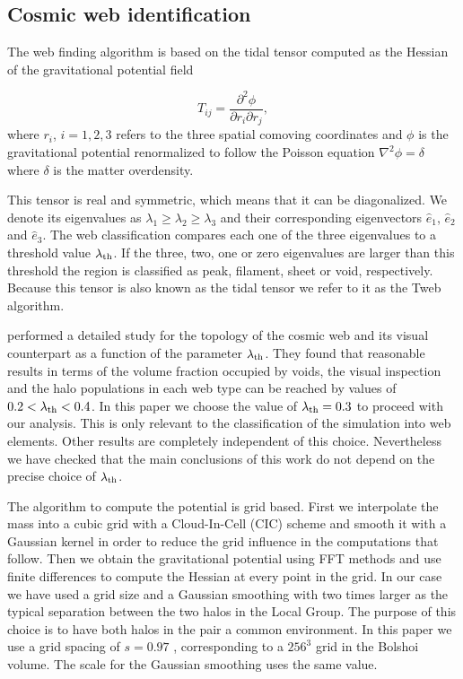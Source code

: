 \documentclass{emulateapj}
\newcommand{\manuscript}{paper }
\newcommand{\hMpc}{{\ifmmode{h^{-1}{\rm Mpc}}\else{$h^{-1}$Mpc }\fi}}
\begin{document}
\subsection{Cosmic web identification}
The web finding algorithm is based on the tidal tensor computed as the
Hessian of the  gravitational potential field

\begin{equation}
T_{ij} = \frac{\partial^2 \phi}{\partial r_i \partial r_j}, 
\end{equation}
%
where $r_{i}$, $i=1,2,3$ refers to the three spatial comoving
coordinates and $\phi$ is the gravitational potential renormalized to
follow the Poisson equation $\nabla^2\phi=\delta$ where
$\delta$ is the matter overdensity.  

This tensor is real and symmetric, which means that it can be
diagonalized. 
We denote its eigenvalues as $\lambda_1\geq \lambda_2\geq
\lambda_3$ and their corresponding eigenvectors $\hat{e}_1$,
$\hat{e}_2$ and $\hat{e}_3$. 
The web classification compares each one
of the three eigenvalues to a threshold value $\lambda_{\rm th}$. 
If
the three, two, one or zero eigenvalues are larger than this threshold
the region is classified as peak, filament, sheet or void,
respectively.  Because this tensor is also known as the tidal tensor
we refer to it as the Tweb algorithm. 


\cite{Tweb} performed a detailed study for the topology of the
cosmic web and its visual counterpart as a function of the parameter
$\lambda_{\rm th}$. 
They found that reasonable results in terms of the
volume fraction occupied by voids, the visual inspection and the halo
populations in each web type can be reached by values of $0.2<\lambda_{\rm
th}<0.4$. 
In this \manuscript we choose the value of $\lambda_{\rm
  th}=0.3$ to proceed with our analysis. 
This is only relevant to the classification of the simulation into web
elements. Other results are completely independent of this
choice. Nevertheless we have checked that the main conclusions of this
work do not depend on the precise choice of $\lambda_{\rm th}$.


The algorithm to compute the potential is grid based. 
First we interpolate the mass into a cubic grid with a
Cloud-In-Cell (CIC) scheme and smooth it with a Gaussian kernel in order to reduce the grid influence in the computations that follow. 
Then we obtain the gravitational potential using FFT methods and use finite differences
to compute the Hessian at every point in the grid. 
In our case we have used a grid size and a Gaussian smoothing with
two times larger as the typical separation between the two halos in the Local Group. 
The purpose of this choice is to have both halos in the pair a common
environment. 
In this \manuscript we use a grid spacing of $s=0.97$ \hMpc,
corresponding to a $256^3$ grid in the Bolshoi volume. 
The scale for the Gaussian smoothing uses the same value.
\end{document}

